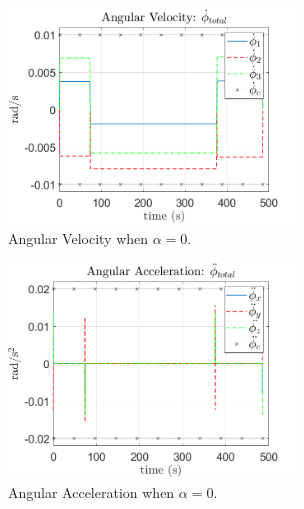 \documentclass[letterpaper, preprint, paper,11pt]{AAS}	%
\begin{document}
\begin{multicols}{2}
	\begin{figure}[H]
		\begin{center}
			\includegraphics[width=3in]{figures/alpha0/ang_vel.png}
		\end{center}
		\caption{Angular Velocity when $\alpha=0$.}
		\label{fig:ang_vel_phi_total_alpha0}
	\end{figure}
	\columnbreak
	\begin{figure}[H]
		\begin{center}
			\includegraphics[width=3in]{figures/alpha0/ang_accel.png}
		\end{center}
		\caption{Angular Acceleration when $\alpha=0$.}
		\label{fig:ang_accel_total_alpha0}
	\end{figure}
\end{multicols}
\end{document}
